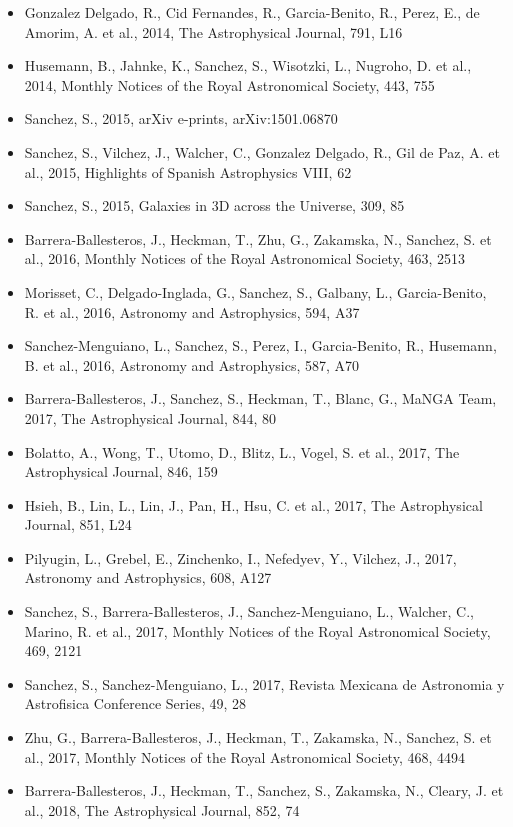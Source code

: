 \documentclass{letter}
\begin{document}
\begin{enumerate}
\begin{itemize}
\item Gonzalez Delgado, R., Cid Fernandes, R., Garcia-Benito, R., Perez, E., de Amorim, A. et al., 2014, The Astrophysical Journal, 791, L16
\item Husemann, B., Jahnke, K., Sanchez, S., Wisotzki, L., Nugroho, D. et al., 2014, Monthly Notices of the Royal Astronomical Society, 443, 755
\item Sanchez, S., 2015, arXiv e-prints, arXiv:1501.06870
\item Sanchez, S., Vilchez, J., Walcher, C., Gonzalez Delgado, R., Gil de Paz, A. et al., 2015, Highlights of Spanish Astrophysics VIII, 62
\item Sanchez, S., 2015, Galaxies in 3D across the Universe, 309, 85
\item Barrera-Ballesteros, J., Heckman, T., Zhu, G., Zakamska, N., Sanchez, S. et al., 2016, Monthly Notices of the Royal Astronomical Society, 463, 2513
\item Morisset, C., Delgado-Inglada, G., Sanchez, S., Galbany, L., Garcia-Benito, R. et al., 2016, Astronomy and Astrophysics, 594, A37
\item Sanchez-Menguiano, L., Sanchez, S., Perez, I., Garcia-Benito, R., Husemann, B. et al., 2016, Astronomy and Astrophysics, 587, A70
\item Barrera-Ballesteros, J., Sanchez, S., Heckman, T., Blanc, G., MaNGA Team, 2017, The Astrophysical Journal, 844, 80
\item Bolatto, A., Wong, T., Utomo, D., Blitz, L., Vogel, S. et al., 2017, The Astrophysical Journal, 846, 159
\item Hsieh, B., Lin, L., Lin, J., Pan, H., Hsu, C. et al., 2017, The Astrophysical Journal, 851, L24
\item Pilyugin, L., Grebel, E., Zinchenko, I., Nefedyev, Y., Vilchez, J., 2017, Astronomy and Astrophysics, 608, A127
\item Sanchez, S., Barrera-Ballesteros, J., Sanchez-Menguiano, L., Walcher, C., Marino, R. et al., 2017, Monthly Notices of the Royal Astronomical Society, 469, 2121
\item Sanchez, S., Sanchez-Menguiano, L., 2017, Revista Mexicana de Astronomia y Astrofisica Conference Series, 49, 28
\item Zhu, G., Barrera-Ballesteros, J., Heckman, T., Zakamska, N., Sanchez, S. et al., 2017, Monthly Notices of the Royal Astronomical Society, 468, 4494
\item Barrera-Ballesteros, J., Heckman, T., Sanchez, S., Zakamska, N., Cleary, J. et al., 2018, The Astrophysical Journal, 852, 74

\end{itemize}
\end{enumerate}
\end{document}
